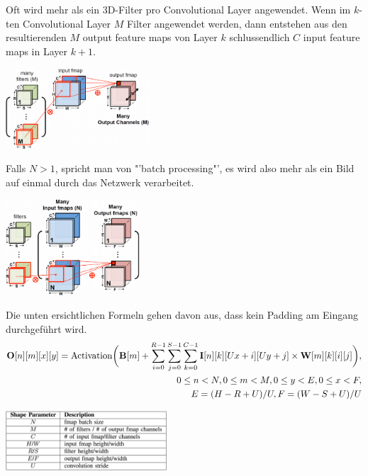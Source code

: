 Oft wird mehr als ein 3D-Filter pro Convolutional Layer angewendet. Wenn im $k$-ten Convolutional Layer $M$ Filter angewendet werden, dann entstehen aus den resultierenden  $M$ output feature maps von Layer $k$ schlussendlich $C$ input feature maps in Layer $k+1$.
\vspace{-4mm}
\begin{center}
		\includegraphics[width=0.4\textwidth]{../fig/convolutional_layer_details3}
\end{center}
Falls $N>1$, spricht man von "'batch processing"', es wird also mehr als ein Bild auf einmal durch das Netzwerk verarbeitet. 
\vspace{-4mm}
\begin{center}
		\includegraphics[width=0.375\textwidth]{../fig/convolutional_layer_details4}
\end{center}
Die unten ersichtlichen Formeln gehen davon aus, dass kein Padding am Eingang durchgeführt wird.
\begin{align*} 
	\text{\textbf{O}}[n][m][x][y] = \text{Activation}\bigg( \text{\textbf{B}}[m] + \sum_{i=0}^{R-1} \sum_{j=0}^{S-1} \sum_{k=0}^{C-1} \text{\textbf{I}}[n][k][Ux+i][Uy+j] \times \text{\textbf{W}}[m][k][i][j] \bigg), \\
	0\leq n < N, 0\leq m < M, 0\leq y < E, 0 \leq x <F,\\
	E=(H-R+U)/U,F=(W-S+U)/U
\end{align*}
\begin{center}
		\includegraphics[width=0.45\textwidth]{../fig/naming_cnn}
\end{center}
